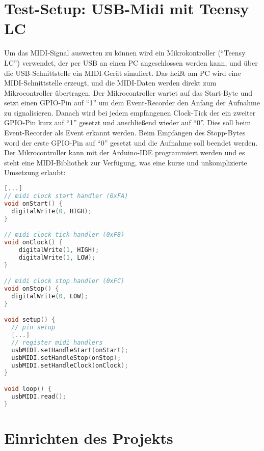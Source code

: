 \section{Test-Setup: USB-Midi mit Teensy LC}
  
Um das MIDI-Signal auswerten zu können wird ein Mikrokontroller (``Teensy LC'') verwendet, der per USB an einen PC angeschlossen werden kann, und über die USB-Schnittstelle ein MIDI-Gerät simuliert.  Das heißt am PC wird eine MIDI-Schnittstelle erzeugt, und die MIDI-Daten werden direkt zum Mikrocontroller übertragen. Der Mikrocontroller wartet auf das Start-Byte und setzt einen GPIO-Pin auf ``1'' um dem Event-Recorder den Anfang der Aufnahme zu signalisieren. 
Danach wird bei jedem empfangenen Clock-Tick der ein zweiter GPIO-Pin kurz auf ``1'' gesetzt und anschließend wieder auf ``0''. Dies soll beim Event-Recorder als Event erkannt werden. Beim Empfangen des Stopp-Bytes word der erste GPIO-Pin auf ``0'' gesetzt und die Aufnahme soll beendet werden.\\
Der Mikrocontroller kann mit der Arduino-IDE programmiert werden und es steht eine MIDI-Bibliothek zur Verfügung, was eine kurze und unkomplizierte Umsetzung erlaubt:
\begin{lstlisting}[language=c]
[...]
// midi clock start handler (0xFA)
void onStart() {
  digitalWrite(0, HIGH);
}

// midi clock tick handler (0xF8) 
void onClock() {
    digitalWrite(1, HIGH);
    digitalWrite(1, LOW);
}

// midi clock stop handler (0xFC)
void onStop() {
  digitalWrite(0, LOW);
}

void setup() {
  // pin setup
  [...]
  // register midi handlers
  usbMIDI.setHandleStart(onStart);
  usbMIDI.setHandleStop(onStop);
  usbMIDI.setHandleClock(onClock);
}

void loop() {
  usbMIDI.read();
}
\end{lstlisting}

\section{Einrichten des Projekts}
\label{ch:Anwendungsfall:sec:Einrichten}

